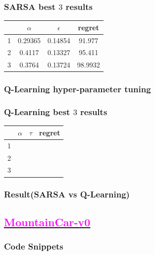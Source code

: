 \documentclass[11pt, a4]{article}
\begin{document}
			\subsubsection{SARSA best $3$ results}
				\begin{center}
					\begin{tabular}{|c|c|c|c|}
						\hline
						& $\alpha$ & $\epsilon$ & regret\\
						\hline
						1 & 0.29365  & 0.14854 & 91.977\\
						\hline
						2 & 0.4117 & 0.13327 & 95.411\\
						\hline
						3 & 0.3764 & 0.13724 & 98.9932\\
						\hline
					\end{tabular}
				\end{center}
			\subsubsection{Q-Learning hyper-parameter tuning}
			\subsubsection{Q-Learning best $3$ results}
				\begin{center}
					\begin{tabular}{|c|c|c|c|}
						\hline
						& $\alpha$ & $\tau$ & regret\\
						\hline
						1 &  & &\\
						\hline
						2 & & &\\
						\hline
						3 & & &\\
						\hline
					\end{tabular}
					
				\end{center}
			\subsubsection{Result(SARSA vs Q-Learning)}
		\subsection{\href{https://github.com/RitabrataMandal/RL-DA6400-assignment_1/tree/main/mountain_car-v0}{\textcolor{magenta}{MountainCar-v0}}}
			\subsubsection{Code Snippets}
				
				
				
				
				
\end{document}
